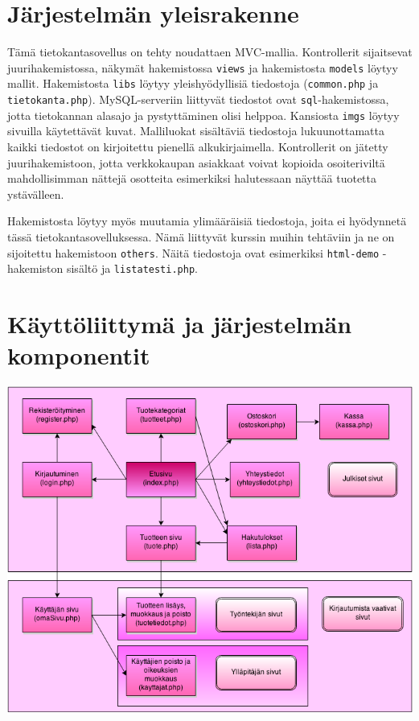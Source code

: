 \documentclass[a4paper,12pt, titlepage]{article}
\begin{document}
\section{Järjestelmän yleisrakenne}
Tämä tietokantasovellus on tehty noudattaen MVC-mallia. Kontrollerit sijaitsevat juurihakemistossa, näkymät hakemistossa \verb|views| ja hakemistosta \verb|models| löytyy mallit. Hakemistosta \verb|libs| löytyy yleishyödyllisiä tiedostoja (\verb|common.php| ja \verb|tietokanta.php|). MySQL-serveriin liittyvät tiedostot ovat \verb|sql|-hakemistossa, jotta tietokannan alasajo ja pystyttäminen olisi helppoa. Kansiosta \verb|imgs| löytyy sivuilla käytettävät kuvat. Malliluokat sisältäviä tiedostoja lukuunottamatta kaikki tiedostot on kirjoitettu pienellä alkukirjaimella. Kontrollerit on jätetty juurihakemistoon, jotta verkkokaupan asiakkaat voivat kopioida osoiteriviltä mahdollisimman nättejä osotteita esimerkiksi halutessaan näyttää tuotetta ystävälleen.

Hakemistosta löytyy myös muutamia ylimääräisiä tiedostoja, joita ei hyödynnetä tässä tietokantasovelluksessa. Nämä liittyvät kurssin muihin tehtäviin ja ne on sijoitettu hakemistoon \verb|others|. Näitä tiedostoja ovat esimerkiksi \verb|html-demo| -hakemiston sisältö ja \verb|listatesti.php|.

\section{Käyttöliittymä ja järjestelmän komponentit}
\hfill

\noindent
\includegraphics[keepaspectratio, width=\textwidth]{kaaviot/kayttoliittymayhteydet.png}
\hfill
\end{document}

